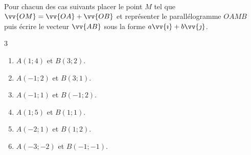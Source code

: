 \documentclass[main.tex]{subfiles}
\begin{document}
%
\newpage 
\begin{exercise}\hfill \\
Pour chacun des cas suivants placer le point $M$ tel que $\vv{OM}=\vv{OA}+\vv{OB}$ et représenter le parallélogramme $OAMB$ puis écrire le vecteur $\vv{AB}$ sous la forme $a\vv{\imath}+b\vv{\jmath}$. 
\begin{multicols}{3} 
\begin{enumerate}[label=\alph*)]
\item $A (1;4)$ et $B  (3;2)$.
\item $A (-1;2)$ et $B  (3;1)$. 
\item $A (-1;1)$ et $B  (-1;2)$. 
\item $A (1;5)$ et $B  (1;1)$. 
\item $A (-2;1)$ et $B  (1;2)$. 
\item $A (-3;-2)$ et $B  (-1;-1)$.  
\end{enumerate} 
\end{multicols}
\end{exercise}
\end{document}
